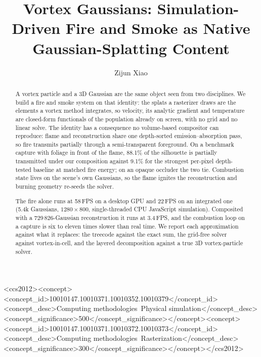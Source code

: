 \documentclass[acmtog,nonacm]{acmart}
\begin{document}
\title{Vortex Gaussians: Simulation-Driven Fire and Smoke as Native Gaussian-Splatting Content}
\author{Zijun Xiao}

\begin{abstract}
A vortex particle and a 3D Gaussian are the same object seen from two disciplines. We build a fire and smoke system on that identity: the splats a rasterizer draws are the elements a vortex method integrates, so velocity, its analytic gradient and temperature are closed-form functionals of the population already on screen, with no grid and no linear solve. The identity has a consequence no volume-based compositor can reproduce: flame and reconstruction share one depth-sorted emission--absorption pass, so fire transmits partially through a semi-transparent foreground. On a benchmark capture with foliage in front of the flame, 88.1\% of the silhouette is partially transmitted under our composition against 9.1\% for the strongest per-pixel depth-tested baseline at matched fire energy; on an opaque occluder the two tie. Combustion state lives on the scene's own Gaussians, so the flame ignites the reconstruction and burning geometry re-seeds the solver.

The fire alone runs at 58\,FPS on a desktop GPU and 22\,FPS on an integrated one (5.4k Gaussians, $1280\times800$, single-threaded CPU JavaScript simulation). Composited with a 729\,826-Gaussian reconstruction it runs at 3.4\,FPS, and the combustion loop on a capture is six to eleven times slower than real time. We report each approximation against what it replaces: the treecode against the exact sum, the grid-free solver against vortex-in-cell, and the layered decomposition against a true 3D vortex-particle solver.
\end{abstract}

\begin{CCSXML}
<ccs2012><concept><concept_id>10010147.10010371.10010352.10010379</concept_id><concept_desc>Computing methodologies~Physical simulation</concept_desc><concept_significance>500</concept_significance></concept><concept><concept_id>10010147.10010371.10010372.10010373</concept_id><concept_desc>Computing methodologies~Rasterization</concept_desc><concept_significance>300</concept_significance></concept></ccs2012>
\end{CCSXML}
\end{document}
